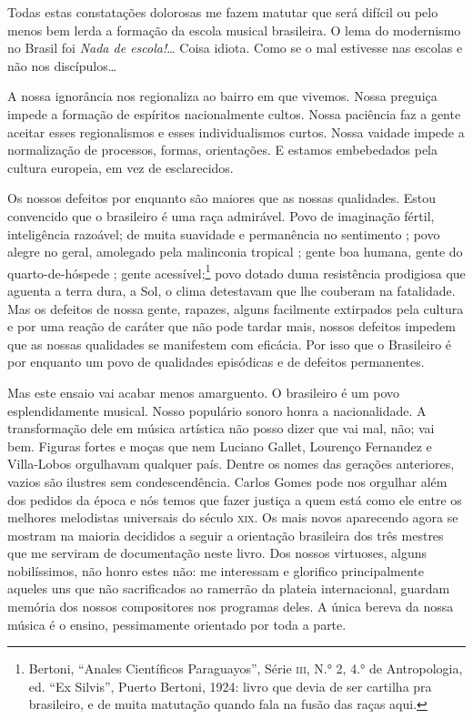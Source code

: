 Todas estas constatações dolorosas me fazem matutar que será difícil ou
pelo menos bem lerda a formação da escola musical brasileira. O lema do
modernismo no Brasil foi \emph{Nada de escola!}\ldots{} Coisa idiota. Como se
o mal estivesse nas escolas e não nos discípulos\ldots{}

A nossa ignorância nos regionaliza ao bairro em que vivemos. Nossa
preguiça impede a formação de espíritos nacionalmente cultos. Nossa
paciência faz a gente aceitar esses regionalismos e esses
individualismos curtos. Nossa vaidade impede a normalização de
processos, formas, orientações. E estamos embebedados pela cultura
europeia, em vez de esclarecidos.

Os nossos defeitos por enquanto são maiores que as nossas qualidades.
Estou convencido que o brasileiro é uma raça admirável. Povo de
imaginação fértil, inteligência razoável; de muita suavidade e
permanência no sentimento ; povo alegre no geral, amolegado pela
malinconia tropical ; gente boa humana, gente do quarto-de-hóspede ;
gente acessível;\footnote{Bertoni, ``Anales Científicos Paraguayos'', Série \textsc{iii},
N.° 2, 4.° de Antropologia, ed. ``Ex Silvis'', Puerto Bertoni, 1924: livro
que devia de ser cartilha pra brasileiro, e de muita matutação quando
fala na fusão das raças aqui.} povo dotado duma resistência prodigiosa
que aguenta a terra dura, a Sol, o clima detestavam que lhe couberam na
fatalidade. Mas os defeitos de nossa gente, rapazes, alguns facilmente
extirpados pela cultura e por uma reação de caráter que não pode tardar
mais, nossos defeitos impedem que as nossas qualidades se manifestem com
eficácia. Por isso que o Brasileiro é por enquanto um povo de qualidades
episódicas e de defeitos permanentes.

Mas este ensaio vai acabar menos amarguento. O brasileiro é um povo
esplendidamente musical. Nosso populário sonoro honra a nacionalidade. A
transformação dele em música artística não posso dizer que vai mal, não;
vai bem. Figuras fortes e moças que nem Luciano Gallet, Lourenço
Fernandez e Villa-Lobos orgulhavam qualquer país. Dentre os nomes das
gerações anteriores, vazios são ilustres sem condescendência. Carlos
Gomes pode nos orgulhar além dos pedidos da época e nós temos que fazer
justiça a quem está como ele entre os melhores melodistas universais do
século \textsc{xix}. Os mais novos aparecendo agora se mostram na maioria decididos
a seguir a orientação brasileira dos três mestres que me serviram de
documentação neste livro. Dos nossos virtuoses, alguns nobilíssimos, não
honro estes não: me interessam e glorifico principalmente aqueles uns
que não sacrificados ao ramerrão da plateia internacional, guardam
memória dos nossos compositores nos programas deles. A única bereva da
nossa música é o ensino, pessimamente orientado por toda a parte.

